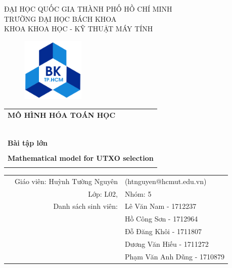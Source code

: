 \begin{titlepage}

\begin{center}
\Large
ĐẠI HỌC QUỐC GIA THÀNH PHỐ HỒ CHÍ MINH\\
TRƯỜNG ĐẠI HỌC BÁCH KHOA\\
KHOA KHOA HỌC - KỸ THUẬT MÁY TÍNH\\
\end{center}

\vspace{1cm}

\begin{figure}[h!]
\begin{center}
\includegraphics[width=3cm]{imag/hcmut.png}
\end{center}
\end{figure}

\vspace{1cm}


\begin{center}
\begin{tabular}{c}
\multicolumn{1}{l}{\textbf{{\Large MÔ HÌNH HÓA TOÁN HỌC}}}\\
~~\\
\hline
\\
\multicolumn{1}{l}{\textbf{{\Large Bài tập lớn}}}\\
\\
\textbf{\huge Mathematical model for UTXO selection}\\
\\
\hline
\end{tabular}
\end{center}

\vspace{3cm}

\begin{table}[h]
\def\arraystretch{1.8}
\begin{tabular}{rrl}
\large
\hspace{5 cm} & Giáo viên: Huỳnh Tường Nguyên & (htnguyen@hcmut.edu.vn)\\
& Lớp: L02, & Nhóm: 5\\
& Danh sách sinh viên: & Lê Văn Nam - 1712237 \\
&                  & Hồ Công Sơn - 1712964 \\
&                  & Đỗ Đăng Khôi - 1711807 \\
&                  & Dương Văn Hiếu - 1711272 \\
&                  & Phạm Văn Anh Dũng - 1710879 \\


\end{tabular}
\end{table}
\end{titlepage}
